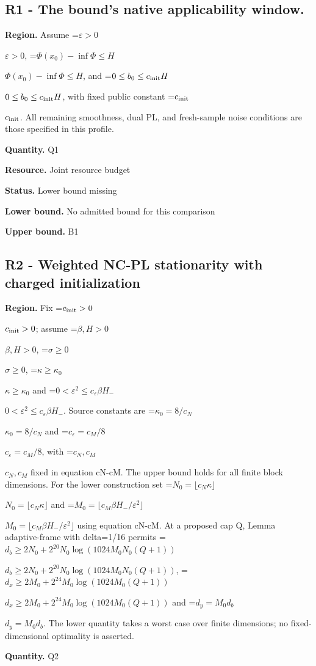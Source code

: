 \documentclass[10pt,a4paper]{article}
\newcommand{\AtlasMath}[1]{\par\begingroup\centering\setbox0=\hbox{$\displaystyle #1$}\ifdim\wd0>1.4\linewidth\typeout{ATLAS WIDE FORMULA: \the\wd0}\fi\ifdim\wd0>\linewidth\resizebox{\linewidth}{!}{\box0}\else\box0\fi\par\endgroup}
\newcommand{\AtlasInlineMath}[1]{\begingroup\setbox0=\hbox{$#1$}\ifdim\wd0>.4\linewidth\endgroup\AtlasMath{#1}\else\endgroup$#1$\fi}
\begin{document}
\subsection{R1 - The bound’s native applicability window.}


\textbf{Region.} Assume \AtlasInlineMath{\varepsilon>0}, \AtlasInlineMath{\Phi(x_0)-\inf\Phi\le H}, and \AtlasInlineMath{0\le b_0\le c_{\rm init}H}, with fixed public constant \AtlasInlineMath{c_{\rm init}}. All remaining smoothness, dual PL, and fresh-sample noise conditions are those specified in this profile.



\textbf{Quantity.} Q1



\textbf{Resource.} Joint resource budget



\textbf{Status.} Lower bound missing



\textbf{Lower bound.} No admitted bound for this comparison



\textbf{Upper bound.} B1



\subsection{R2 - Weighted NC-PL stationarity with charged initialization}


\textbf{Region.} Fix \AtlasInlineMath{c_{\rm init}>0}; assume \AtlasInlineMath{\beta,H>0}, \AtlasInlineMath{\sigma\ge0}, \AtlasInlineMath{\kappa\ge\kappa_0} and \AtlasInlineMath{0<\varepsilon^2\le c_\varepsilon\beta H_-}. Source constants are \AtlasInlineMath{\kappa_0=8/c_N} and \AtlasInlineMath{c_\varepsilon=c_M/8}, with \AtlasInlineMath{c_N,c_M} fixed in equation cN-cM. The upper bound holds for all finite block dimensions. For the lower construction set \AtlasInlineMath{N_0=\lfloor c_N\kappa\rfloor} and \AtlasInlineMath{M_0=\lfloor c_M\beta H_-/\varepsilon^2\rfloor} using equation cN-cM. At a proposed cap Q, Lemma adaptive-frame with delta=1/16 permits \AtlasInlineMath{d_b\ge2N_0+2^{20}N_0\log(1024M_0N_0(Q+1))}, \AtlasInlineMath{d_x\ge2M_0+2^{24}M_0\log(1024M_0(Q+1))} and \AtlasInlineMath{d_y=M_0d_b}. The lower quantity takes a worst case over finite dimensions; no fixed-dimensional optimality is asserted.



\textbf{Quantity.} Q2
\end{document}
